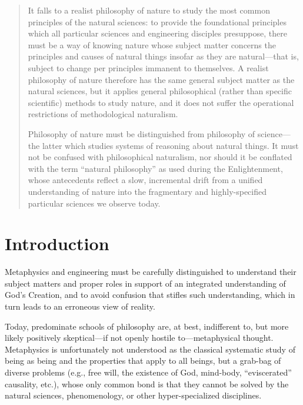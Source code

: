 \begin{abstract}
It falls to a realist philosophy of nature to study the most common principles of the natural sciences: to provide the foundational principles which all particular sciences and engineering disciples presuppose, there must be a way of knowing nature whose subject matter concerns the principles and causes of natural things insofar as they are natural—that is, subject to change per principles immanent to themselves. A realist philosophy of nature therefore has the same general subject matter as the natural sciences, but it applies general philosophical (rather than specific scientific) methods to study nature, and it does not suffer the operational restrictions of methodological naturalism.

Philosophy of nature must be distinguished from philosophy of science—the latter which studies systems of reasoning about natural things. It must not be confused with philosophical naturalism, nor should it be conflated with the term “natural philosophy” as used during the Enlightenment, whose antecedents reflect a slow, incremental drift from a unified understanding of nature into the fragmentary and highly-specified particular sciences we observe today.

\end{abstract}


\section{Introduction}

Metaphysics and engineering must be carefully distinguished to understand their subject matters and proper roles in support of an integrated understanding of God’s Creation, and to avoid confusion that stifles such understanding, which in turn leads to an erroneous view of reality.

Today, predominate schools of philosophy are, at best, indifferent to, but more likely positively skeptical—if not openly hostile to—metaphysical thought. Metaphysics is unfortunately not understood as the classical systematic study of being as being and the properties that apply to all beings, but a grab-bag of diverse problems (e.g., free will, the existence of God, mind-body, “eviscerated” causality, etc.), whose only common bond is that they cannot be solved by the natural sciences, phenomenology, or other hyper-specialized disciplines.

